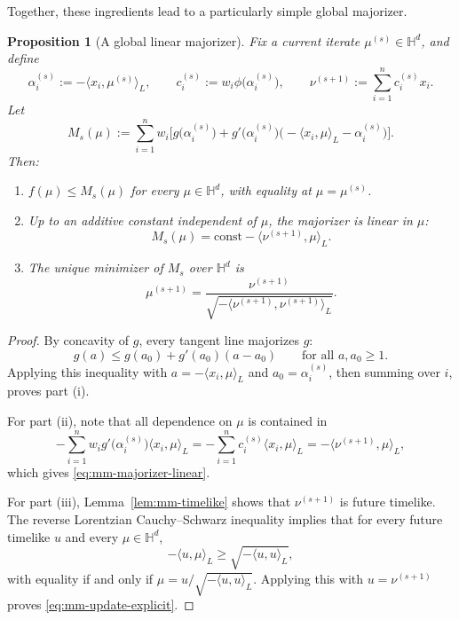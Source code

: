 \documentclass[11pt]{article}
\newtheorem{proposition}[theorem]{Proposition}
\begin{document}
Together, these ingredients lead to a particularly simple global majorizer.

\begin{proposition}[A global linear majorizer]\label{prop:mm-majorizer}
Fix a current iterate \(\mu^{(s)}\in\mathbb{H}^d\), and define
\[
\alpha_i^{(s)}:=-\langle x_i,\mu^{(s)}\rangle_L,
\qquad
c_i^{(s)}:=w_i\phi\bigl(\alpha_i^{(s)}\bigr),
\qquad
\nu^{(s+1)}:=\sum_{i=1}^n c_i^{(s)}x_i.
\]
Let
\begin{equation}\label{eq:mm-majorizer}
M_s(\mu)
:=
\sum_{i=1}^n
w_i
\Big[
g\bigl(\alpha_i^{(s)}\bigr)
+
g'\bigl(\alpha_i^{(s)}\bigr)
\bigl(-\langle x_i,\mu\rangle_L-\alpha_i^{(s)}\bigr)
\Big].
\end{equation}
Then:
\begin{enumerate}[label=(\roman*)]
    \item \(f(\mu)\le M_s(\mu)\) for every \(\mu\in\mathbb{H}^d\), with equality at \(\mu=\mu^{(s)}\).
    \item Up to an additive constant independent of \(\mu\), the majorizer is linear in \(\mu\):
    \begin{equation}\label{eq:mm-majorizer-linear}
    M_s(\mu)=\mathrm{const}-\langle \nu^{(s+1)},\mu\rangle_L.
    \end{equation}
    \item The unique minimizer of \(M_s\) over \(\mathbb{H}^d\) is
    \begin{equation}\label{eq:mm-update-explicit}
    \mu^{(s+1)}
    =
    \frac{\nu^{(s+1)}}{\sqrt{-\langle \nu^{(s+1)},\nu^{(s+1)}\rangle_L}}.
    \end{equation}
\end{enumerate}
\end{proposition}

\begin{proof}
By concavity of \(g\), every tangent line majorizes \(g\):
\[
g(a)\le g(a_0)+g'(a_0)(a-a_0)
\qquad\text{for all }a,a_0\ge 1.
\]
Applying this inequality with \(a=-\langle x_i,\mu\rangle_L\) and \(a_0=\alpha_i^{(s)}\), then summing over \(i\), proves part (i).

For part (ii), note that all dependence on \(\mu\) is contained in
\[
-\sum_{i=1}^n w_i g'\bigl(\alpha_i^{(s)}\bigr)\langle x_i,\mu\rangle_L
=
-\sum_{i=1}^n c_i^{(s)}\langle x_i,\mu\rangle_L
=
-\langle \nu^{(s+1)},\mu\rangle_L,
\]
which gives \eqref{eq:mm-majorizer-linear}.

For part (iii), Lemma~\ref{lem:mm-timelike} shows that \(\nu^{(s+1)}\) is future timelike. The reverse Lorentzian Cauchy--Schwarz inequality implies that for every future timelike \(u\) and every \(\mu\in\mathbb{H}^d\),
\[
-\langle u,\mu\rangle_L\ge \sqrt{-\langle u,u\rangle_L},
\]
with equality if and only if \(\mu=u/\sqrt{-\langle u,u\rangle_L}\). Applying this with \(u=\nu^{(s+1)}\) proves \eqref{eq:mm-update-explicit}.
\end{proof}
\end{document}
